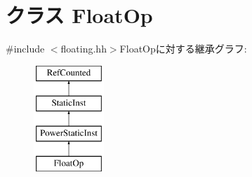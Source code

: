 \hypertarget{classPowerISA_1_1FloatOp}{
\section{クラス FloatOp}
\label{classPowerISA_1_1FloatOp}
}


{\ttfamily \#include $<$floating.hh$>$}FloatOpに対する継承グラフ:\begin{figure}[H]
\begin{center}
\leavevmode
\includegraphics[height=4cm]{classPowerISA_1_1FloatOp}
\end{center}
\end{figure}
